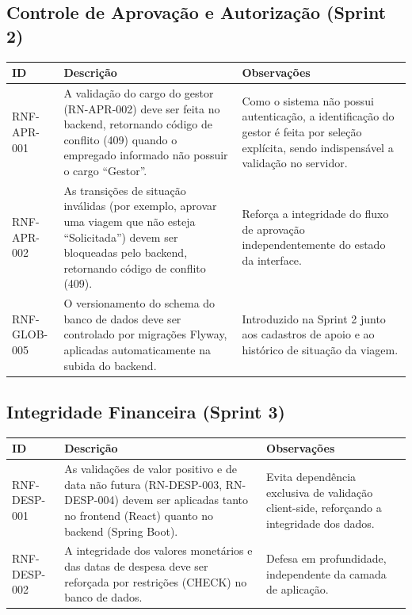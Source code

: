 \documentclass[12pt,article,oneside,a4paper]{abntex2}
\begin{document}
\bigskip

\subsection{Controle de Aprovação e Autorização (Sprint 2)}

\begin{xltabular}{\textwidth}{|l|Y|Y|}
\hline
{}
\textbf{ID} & \textbf{Descrição} & \textbf{Observações} \\
\hline
\endhead
RNF-APR-001 & A validação do cargo do gestor (RN-APR-002) deve ser feita no backend, retornando código de conflito (409) quando o empregado informado não possuir o cargo ``Gestor''. & Como o sistema não possui autenticação, a identificação do gestor é feita por seleção explícita, sendo indispensável a validação no servidor. \\
\hline
RNF-APR-002 & As transições de situação inválidas (por exemplo, aprovar uma viagem que não esteja ``Solicitada'') devem ser bloqueadas pelo backend, retornando código de conflito (409). & Reforça a integridade do fluxo de aprovação independentemente do estado da interface. \\
\hline
RNF-GLOB-005 & O versionamento do schema do banco de dados deve ser controlado por migrações Flyway, aplicadas automaticamente na subida do backend. & Introduzido na Sprint 2 junto aos cadastros de apoio e ao histórico de situação da viagem. \\
\hline
\end{xltabular}

\bigskip

\subsection{Integridade Financeira (Sprint 3)}

\begin{xltabular}{\textwidth}{|l|Y|Y|}
\hline
{}
\textbf{ID} & \textbf{Descrição} & \textbf{Observações} \\
\hline
\endhead
RNF-DESP-001 & As validações de valor positivo e de data não futura (RN-DESP-003, RN-DESP-004) devem ser aplicadas tanto no frontend (React) quanto no backend (Spring Boot). & Evita dependência exclusiva de validação client-side, reforçando a integridade dos dados. \\
\hline
RNF-DESP-002 & A integridade dos valores monetários e das datas de despesa deve ser reforçada por restrições (CHECK) no banco de dados. & Defesa em profundidade, independente da camada de aplicação. \\
\hline
\end{xltabular}
\end{document}
